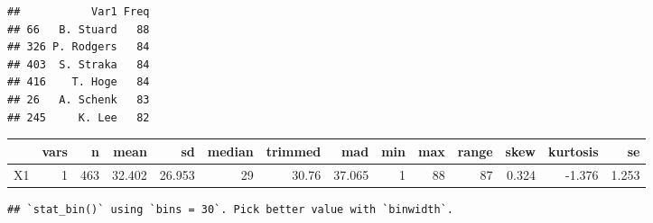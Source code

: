 \documentclass[
]{article}
\newenvironment{Shaded}{\begin{snugshade}}{\end{snugshade}}
\newcommand{\DataTypeTok}[1]{\textcolor[rgb]{0.13,0.29,0.53}{#1}}
\newcommand{\DecValTok}[1]{\textcolor[rgb]{0.00,0.00,0.81}{#1}}
\newcommand{\KeywordTok}[1]{\textcolor[rgb]{0.13,0.29,0.53}{\textbf{#1}}}
\newcommand{\NormalTok}[1]{#1}
\newcommand{\OperatorTok}[1]{\textcolor[rgb]{0.81,0.36,0.00}{\textbf{#1}}}
\newcommand{\StringTok}[1]{\textcolor[rgb]{0.31,0.60,0.02}{#1}}
\begin{document}
\begin{verbatim}
##           Var1 Freq
## 66   B. Stuard   88
## 326 P. Rodgers   84
## 403  S. Straka   84
## 416    T. Hoge   84
## 26   A. Schenk   83
## 245     K. Lee   82
\end{verbatim}

\begin{Shaded}
\end{Shaded}

\begin{longtable}[]{@{}lrrrrrrrrrrrrr@{}}
\toprule
& vars & n & mean & sd & median & trimmed & mad & min & max & range &
skew & kurtosis & se\tabularnewline
\midrule
\endhead
X1 & 1 & 463 & 32.402 & 26.953 & 29 & 30.76 & 37.065 & 1 & 88 & 87 &
0.324 & -1.376 & 1.253\tabularnewline
\bottomrule
\end{longtable}

\begin{Shaded}
\end{Shaded}

\begin{verbatim}
## `stat_bin()` using `bins = 30`. Pick better value with `binwidth`.
\end{verbatim}
\end{document}
